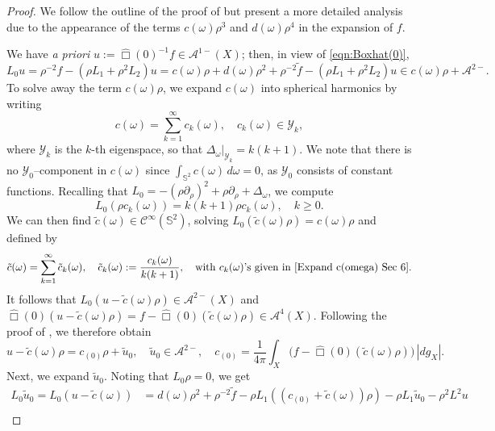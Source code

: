 \documentclass[10pt,a4paper,reqno]{amsart}
\newcommand{\CI}{\mathcal{C}^\infty}
\newcommand{\A}{\mathcal{A}}
\newcommand{\pa}{\partial}
\renewcommand{\S}{{\mathbb S}}
\theoremstyle{definition}
\theoremstyle{remark}
\numberwithin{equation}{section}
\newcommand{\wh}{\widehat}
\begin{document}
\begin{proof}
We follow the outline of the proof of \cite[Theorem 3.1]{Hin22} but present a more detailed analysis due to the appearance of the terms $c(\omega)\rho^3$ and $d(\omega)\rho^4$ in the expansion of $f$. 

We have \textit{a priori} $u:=\wh\Box(0)^{-1}f \in\A^{1-}(X)$; then, in view of \eqref{eqn:Boxhat(0)}, 
\[
    L_0 u = \rho^{-2} f - (\rho L_1 + \rho^2 L_2)u = c(\omega)\rho + d(\omega)\rho^2 + \rho^{-2}\tilde{f} - (\rho L_1 + \rho^2 L_2)u \in c(\omega)\rho + \mathcal{A}^{2-} .
\]
To solve away the term $c(\omega)\rho$, we expand $c(\omega)$ into spherical harmonics by writing
\begin{equation}
\label{Expand c(omega) Sec 6}
	c(\omega) = \sum_{k=1}^\infty c_k(\omega),\quad c_k(\omega)\in\mathcal{Y}_k,
\end{equation}
where $\mathcal{Y}_k$ is the $k$-th eigenspace, so that $\Delta_\omega|_{\mathcal{Y}_k} = k(k+1)$. We note that there is no $\mathcal{Y}_0$--component in $c(\omega)$ since $\int_{\S^2} c(\omega)\,d\omega=0$, as $\mathcal{Y}_0$ consists of constant functions. Recalling that $L_0 = -(\rho\pa_\rho)^2 + \rho\pa_\rho + \Delta_\omega$, we compute
\begin{equation}
\label{L0 on rhoYk}
	L_0(\rho c_k(\omega)) = k(k+1)\rho c_k(\omega),\quad k\geq 0.
\end{equation}
We can then find $\tilde{c}(\omega)\in\CI(\S^2)$, solving $L_0 (\tilde{c}(\omega)\rho) = c(\omega)\rho$ and defined by
\begin{equation}
\label{Tilde c(omega) Sec 6}
	\tilde{c}(\omega) = \sum_{k=1}^{\infty} \tilde{c}_k(\omega),\quad \tilde{c}_k(\omega):=\frac{c_k(\omega)}{k(k+1)},\quad\text{with $c_k(\omega)$'s given in \eqref{Expand c(omega) Sec 6}}.
\end{equation} 
It follows that $L_0 (u-\tilde{c}(\omega)\rho) \in \A^{2-}(X)$ and $\wh\Box(0)(u-\tilde{c}(\omega)\rho) = f - \wh\Box(0)(\tilde{c}(\omega)\rho) \in \A^4(X)$. Following the proof of \cite[Lemma 3.2]{Hin22}, we therefore obtain 
\[
    u - \tilde{c}(\omega)\rho = c_{(0)}\rho + \tilde{u}_0,\quad \tilde{u}_0\in \A^{2-},\quad c_{(0)} = \frac{1}{4\pi}\int_X \big(f-\wh\Box(0)(\tilde{c}(\omega)\rho)\big) \,|dg_X| .
\]
Next, we expand $\tilde u_0$. Noting that $L_0 \rho = 0$, we get 
\[
\begin{split}
	L_0 \tilde{u}_0 = L_0 (u-\tilde{c}(\omega)) &= d(\omega)\rho^2 + \rho^{-2}\tilde{f} - \rho L_1 ((c_{(0)} + \tilde{c}(\omega))\rho) - \rho L_1 \tilde{u}_0 - \rho^2 L^2 u \\

\end{split}\]
\end{proof}
\end{document}
